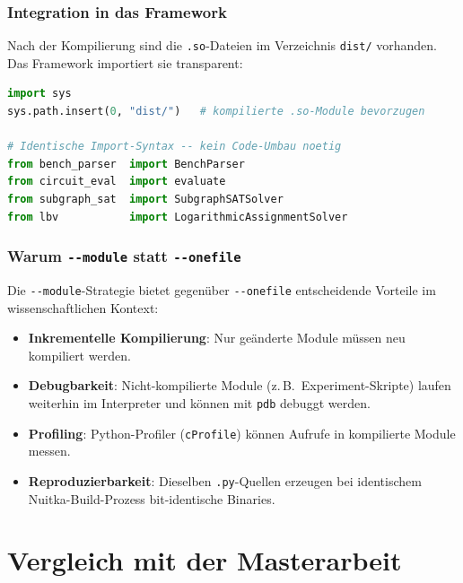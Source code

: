 ﻿\documentclass[a4paper,12pt]{article}
\theoremstyle{definition}
\begin{document}
\subsubsection{Integration in das Framework}

Nach der Kompilierung sind die \texttt{.so}-Dateien im Verzeichnis
\texttt{dist/} vorhanden.  Das Framework importiert sie transparent:
\begin{lstlisting}[language=Python, caption={Transparenter Import kompilierter Module}]
import sys
sys.path.insert(0, "dist/")   # kompilierte .so-Module bevorzugen

# Identische Import-Syntax -- kein Code-Umbau noetig
from bench_parser  import BenchParser
from circuit_eval  import evaluate
from subgraph_sat  import SubgraphSATSolver
from lbv           import LogarithmicAssignmentSolver
\end{lstlisting}

\subsubsection{Warum \texttt{-{}-module} statt \texttt{-{}-onefile}}

Die \texttt{-{}-module}-Strategie bietet gegenüber \texttt{-{}-onefile}
entscheidende Vorteile im wissenschaftlichen Kontext:
\begin{itemize}
  \item[-] \textbf{Inkrementelle Kompilierung}: Nur geänderte Module
    müssen neu kompiliert werden.
  \item[-] \textbf{Debugbarkeit}: Nicht-kompilierte Module (z.\,B.\
    Experiment-Skripte) laufen weiterhin im Interpreter und können
    mit \texttt{pdb} debuggt werden.
  \item[-] \textbf{Profiling}: Python-Profiler (\texttt{cProfile})
    können Aufrufe in kompilierte Module messen.
  \item[-] \textbf{Reproduzierbarkeit}: Dieselben \texttt{.py}-Quellen
    erzeugen bei identischem Nuitka-Build-Prozess bit-identische Binaries.
\end{itemize}

\section{Vergleich mit der Masterarbeit}
\end{document}
